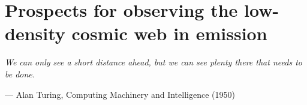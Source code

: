 \chapter{Prospects for observing the low-density cosmic web in \texorpdfstring{\lymana}{\lymanatext} emission}
\label{ch:Prospects_for_observing_the_low-density_cosmic_web_in_Lya_emission}

\ifsetDraft
\else
    \renewcommand{\CurrentTitleColor}{\color{black}}
    
    \vspace*{\fill}
    \setlength{\epigraphwidth}{0.9\textwidth}
    {\color{white} \epigraph{\textit{We can only see a short distance ahead, but we can see plenty there that needs to be done.}}{--- Alan Turing, Computing Machinery and Intelligence (1950)}}
    \vspace*{\fill}
    
    \BgThispage
    
